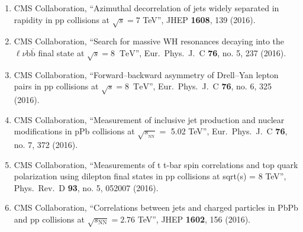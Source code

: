 \begin{itemize}
\begin{enumerate}
\item CMS Collaboration, ``Azimuthal decorrelation of jets widely separated in rapidity in pp collisions at $ \sqrt{s}=7 $ TeV'', JHEP {\bf 1608}, 139 (2016).

\item CMS Collaboration, ``Search for massive WH resonances decaying into the $\ell \nu \mathrm{b} \overline{\mathrm{b}} $ final state at $\sqrt{s}=8$ $~\text {TeV}$'', Eur.\ Phys.\ J.\ C {\bf 76}, no. 5, 237 (2016).

\item CMS Collaboration, ``Forward–backward asymmetry of Drell–Yan lepton pairs in pp collisions at $\sqrt{s} = 8$ $\,\mathrm{TeV}$'', Eur.\ Phys.\ J.\ C {\bf 76}, no. 6, 325 (2016).

\item CMS Collaboration, ``Measurement of inclusive jet production and nuclear modifications in pPb collisions at $\sqrt{s_{_\mathrm {NN}}} =$ 5.02 TeV'', Eur.\ Phys.\ J.\ C {\bf 76}, no. 7, 372 (2016).

\item CMS Collaboration, ``Measurements of t t-bar spin correlations and top quark polarization using dilepton final states in pp collisions at sqrt(s) = 8 TeV'', Phys.\ Rev.\ D {\bf 93}, no. 5, 052007 (2016).

\item CMS Collaboration, ``Correlations between jets and charged particles in PbPb and pp collisions at $ \sqrt{s_{\mathrm{NN}}}=2.76 $ TeV'', JHEP {\bf 1602}, 156 (2016).


\end{enumerate}
\end{itemize}

